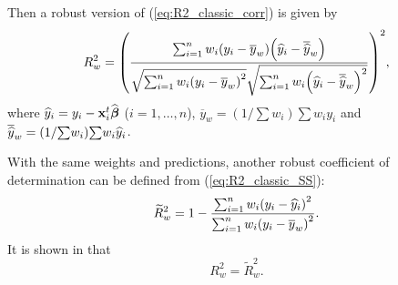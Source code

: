 Then a robust version of (\ref{eq:R2_classic_corr}) is given by
\begin{equation}
R_{w}^{2}=\left(  \frac{\sum_{i=1}^{n}w_{i}\left(  y_{i}-\overline{y}%
_{w}\right)  \left(  \sthat{y}_{i}-\overline{\sthat{y}}_{w}\right)
}{\sqrt{\sum_{i=1}^{n}w_{i}\left(  y_{i}-\overline{y}_{w}\right)  ^{2}}%
\sqrt{\sum_{i=1}^{n}w_{i}\left(  \sthat{y}_{i}-\overline{\sthat{y}}%
_{w}\right)  ^{2}}}\right)  ^{2}, \label{eq:R2_w}%
\end{equation}
where $\widehat{y}_{i}=y_{i}-\mathbf x_{i}^{t}\widehat{\boldsymbol\beta}$
($i = 1, \dots, n$), $\overline{y}_{w}=\left(  1/%
{\textstyle\sum}
w_{i}\right)
{\textstyle\sum}
w_{i}y_{i}$ and $\overline{\sthat{y}}_{w}=\left(  1/%
{\textstyle\sum}
w_{i}\right)
{\textstyle\sum}
w_{i}\sthat{y}_{i}$.

With the same weights and predictions, another robust coefficient of
determination can be defined from (\ref{eq:R2_classic_SS}):
\begin{equation}
\widetilde{R}_{w}^{2}=1-\frac{\sum_{i=1}^{n}w_{i}\left(  y_{i}-\sthat{y}%
_{i}\right)  ^{2}}{\sum_{i=1}^{n}w_{i}\left(  y_{i}-\overline{y}_{w}\right)
^{2}}. \label{eq:Rtilde2_w}%
\end{equation}
It is shown in \citet{Renaud:2010} that
\[
R_{w}^{2}=\widetilde{R}_{w}^{2}.
\]



